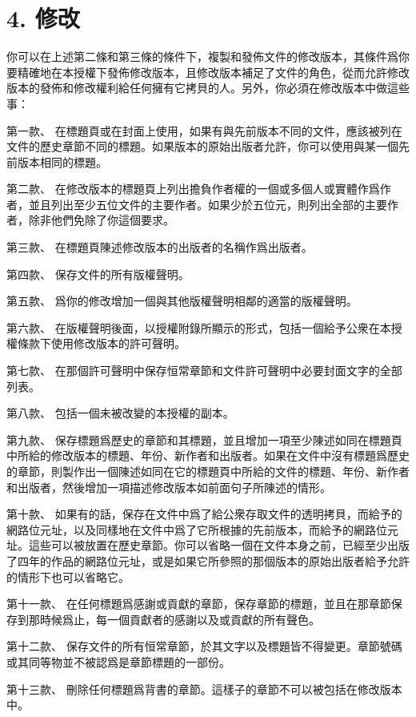 \section{4. 修改}
你可以在上述第二條和第三條的條件下，複製和發佈文件的修改版本，其條件爲你要精確地在本授權下發佈修改版本，且修改版本補足了文件的角色，從而允許修改版本的發佈和修改權利給任何擁有它拷貝的人。另外，你必須在修改版本中做這些事：\par
第一款、 在標題頁或在封面上使用，如果有與先前版本不同的文件，應該被列在文件的歷史章節不同的標題。如果版本的原始出版者允許，你可以使用與某一個先前版本相同的標題。\par
第二款、 在修改版本的標題頁上列出擔負作者權的一個或多個人或實體作爲作者，並且列出至少五位文件的主要作者。如果少於五位元，則列出全部的主要作者，除非他們免除了你這個要求。\par
第三款、 在標題頁陳述修改版本的出版者的名稱作爲出版者。\par
第四款、 保存文件的所有版權聲明。\par
第五款、 爲你的修改增加一個與其他版權聲明相鄰的適當的版權聲明。\par
第六款、 在版權聲明後面，以授權附錄所顯示的形式，包括一個給予公衆在本授權條款下使用修改版本的許可聲明。\par
第七款、 在那個許可聲明中保存恒常章節和文件許可聲明中必要封面文字的全部列表。\par
第八款、 包括一個未被改變的本授權的副本。\par
第九款、 保存標題爲歷史的章節和其標題，並且增加一項至少陳述如同在標題頁中所給的修改版本的標題、年份、新作者和出版者。如果在文件中沒有標題爲歷史的章節，則製作出一個陳述如同在它的標題頁中所給的文件的標題、年份、新作者和出版者，然後增加一項描述修改版本如前面句子所陳述的情形。\par
第十款、 如果有的話，保存在文件中爲了給公衆存取文件的透明拷貝，而給予的網路位元址，以及同樣地在文件中爲了它所根據的先前版本，而給予的網路位元址。這些可以被放置在歷史章節。你可以省略一個在文件本身之前，已經至少出版了四年的作品的網路位元址，或是如果它所參照的那個版本的原始出版者給予允許的情形下也可以省略它。\par
第十一款、 在任何標題爲感謝或貢獻的章節，保存章節的標題，並且在那章節保存到那時候爲止，每一個貢獻者的感謝以及或貢獻的所有聲色。\par
第十二款、 保存文件的所有恒常章節，於其文字以及標題皆不得變更。章節號碼或其同等物並不被認爲是章節標題的一部份。\par
第十三款、 刪除任何標題爲背書的章節。這樣子的章節不可以被包括在修改版本中。\par
